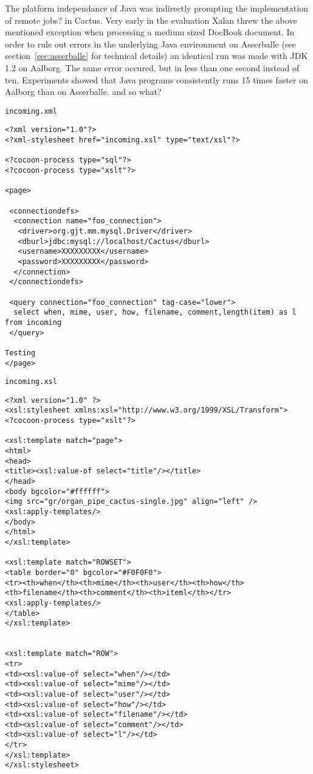 The platform independance of Java was indirectly prompting the
implementation of remote \textsf{jobs?} in Cactus.  Very early in the
evaluation Xalan threw the above mentioned exception when processing a
medium sized DocBook document.  In order to rule out errors in the
underlying Java environment on Asserballe (see
section~\ref{sec:asserballe} for technical details) an identical run
was made with JDK 1.2 on Aalborg.  The same error occured, but in less
than one second instead of ten.  Experiments showed that Java programs
consistently runs 15 times faster on Aalborg than on Asserballe.
\textsf{and so what?}

\texttt{incoming.xml}
\begin{verbatim}
<?xml version="1.0"?>
<?xml-stylesheet href="incoming.xsl" type="text/xsl"?>

<?cocoon-process type="sql"?>
<?cocoon-process type="xslt"?>

<page>

 <connectiondefs>
  <connection name="foo_connection">
   <driver>org.gjt.mm.mysql.Driver</driver>
   <dburl>jdbc:mysql://localhost/Cactus</dburl>
   <username>XXXXXXXXX</username>
   <password>XXXXXXXXX</password>
  </connection>
 </connectiondefs> 
 
 <query connection="foo_connection" tag-case="lower">
  select when, mime, user, how, filename, comment,length(item) as l  from incoming
 </query>

Testing 
</page>
\end{verbatim}

\texttt{incoming.xsl}
\begin{verbatim}
<?xml version="1.0" ?>
<xsl:stylesheet xmlns:xsl="http://www.w3.org/1999/XSL/Transform">
<?cocoon-process type="xslt"?>

<xsl:template match="page">
<html>
<head>
<title><xsl:value-of select="title"/></title>
</head>
<body bgcolor="#ffffff">
<img src="gr/organ_pipe_cactus-single.jpg" align="left" />
<xsl:apply-templates/>
</body>
</html>
</xsl:template>

<xsl:template match="ROWSET">
<table border="0" bgcolor="#F0F0F0">
<tr><th>when</th><th>mime</th><th>user</th><th>how</th><th>filename</th><th>comment</th><th>iteml</th></tr>
<xsl:apply-templates/>
</table>
</xsl:template>


<xsl:template match="ROW">
<tr> 
<td><xsl:value-of select="when"/></td>
<td><xsl:value-of select="mime"/></td>
<td><xsl:value-of select="user"/></td>
<td><xsl:value-of select="how"/></td>
<td><xsl:value-of select="filename"/></td>
<td><xsl:value-of select="comment"/></td>
<td><xsl:value-of select="l"/></td>
</tr>
</xsl:template>
</xsl:stylesheet>
\end{verbatim}


